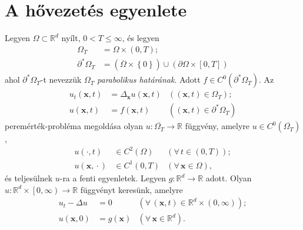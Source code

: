 \documentclass[DIV=15,appendixprefix]{scrreprt}
\theoremstyle{definition}
\theoremstyle{remark}
\begin{document}
\section{A hővezetés egyenlete}
%
Legyen $ \Omega \subset \mathbb{ R }^{ d } $ nyílt, $ 0 < T \le \infty $, és legyen
\begin{align*}
	\Omega_{ T } 				&= \Omega \times \left( 0,{} T \right);\\
	\partial^{ * }\Omega_{ T } 	&= \left( \overline{ \Omega } \times \left\{ 0 \right\} \right) \cup
		\left( \partial \Omega \times \left[ 0,{} T \right] \right)
\end{align*}
ahol $ \partial^{ * }\Omega_{ T } $-t nevezzük $ \Omega_{ T } $ \emph{parabolikus határának}. Adott
$ f \in C^{ 0 } \left( \partial^{ * } \Omega_{ T } \right) $. Az
\begin{align*}
	u_{ t } \left( \mathbf{ x },{} t \right) 	&= \Delta_{ \mathbf{ x } } u \left( \mathbf{ x },{}
	t \right) 	& \left( \left( \mathbf{ x },{} t \right) \in \Omega_{ T } \right);\\
	u \left( \mathbf{ x },{} t \right) 			&= f \left( \mathbf{ x },{} t \right)
					 & \left( \left( 		\mathbf{ x },{} t \right) \in \partial^{ * }
					 \Omega_{ T } \right)
\end{align*}
peremérték-probléma megoldása olyan $ u \colon \overline{ \Omega_{ T } } \rightarrow \mathbb{ R } $
függvény, amelyre $ u \in C^{ 0 } \left( \overline{ \Omega_{ T } } \right) $,
\begin{align*}
	u \left( \cdot,{} t \right) & \in C^{ 2 } \left( \Omega \right) & \left( \forall \, t \in \left(
		0,{} T \right) \right);\\
	u \left( \mathbf{ x },{} \cdot \right) & \in C^{ 1 } \left( 0,{} T \right) & \left( \forall \,
		\mathbf{ x } \in \Omega \right),
\end{align*}
és teljesülnek $u$-ra a fenti egyenletek.
Legyen $ g \colon \mathbb{ R }^{ d } \rightarrow \mathbb{ R } $ adott. Olyan $ u \colon
\mathbb{ R }^{ d } \times \left.\left[ 0,{} \infty \right)\right. \rightarrow \mathbb{ R } $
függvényt keresünk, amelyre
\begin{align*}
	u_{ t } - \Delta u &= 0 & \left( \forall \, \left( \mathbf{ x },{} t \right) \in
		\mathbb{ R }^{ d } \times \left( 0,{} \infty \right) \right);\\
	u \left( \mathbf{ x },{} 0 \right) &= g \left( \mathbf{ x } \right) & \left( \forall \,
		\mathbf{ x } \in \mathbb{ R }^{ d } \right).
\end{align*}
\end{document}
